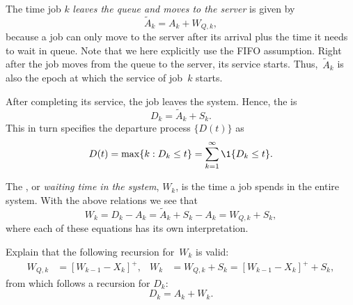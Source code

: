 The time job $k$ \emph{leaves the queue and moves to the server} is given by
\begin{equation*}
 \tilde A_k = A_k + W_{Q,k},
\end{equation*}
because a job can only move to the server after its arrival plus the time it needs to wait in queue.
Note that we here explicitly use the FIFO assumption.
Right after the job moves from the queue to the server, its service starts.
Thus,~$\tilde A_{k}$ is also the epoch at which the service of job~$k$ starts.

After completing its service, the job leaves the system.
Hence, the  is
\begin{equation*}
 D_k = \tilde A_{k} + S_k.
\end{equation*}
This in turn specifies the departure process $\{D(t)\}$ as
\begin{equation*}
 D(t) = \max\{k : D_k \leq t\} = \sum_{k=1}^\infty \1{D_k \leq t}.
\end{equation*}



The , or \emph{waiting time in the system}, $W_k$, is the time a job spends in the entire system.
With the above relations we see that
\begin{equation}
 W_k = D_k - A_k = \tilde A_{k} + S_k -A_k = W_{Q,k} + S_k,
\end{equation}
where each of these equations has its own interpretation. 


\begin{extra}
 Explain that the following recursion for~$W_k$ is valid:
\begin{align}
 \label{eq:59}
 W_{Q,k} &= [W_{k-1} - X_k]^+, &
 W_{k} &= W_{Q,k} + S_k = [W_{k-1} - X_k]^+ + S_k,
\end{align}
from which follows a recursion for $D_k$:
\begin{equation}
 D_k = A_k + W_k.
\end{equation}
\end{extra}

